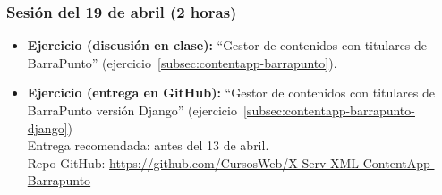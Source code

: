 \documentclass[a4paper,12pt]{article}
\begin{document}
\subsubsection{Sesión del 19 de abril (2 horas)}

\begin{itemize}
\item \textbf{Ejercicio (discusión en clase):} ``Gestor de contenidos con titulares de BarraPunto'' (ejercicio~\ref{subsec:contentapp-barrapunto}). 
\item \textbf{Ejercicio (entrega en GitHub):} ``Gestor de contenidos con titulares de BarraPunto versión Django'' (ejercicio~\ref{subsec:contentapp-barrapunto-django}) \\
  Entrega recomendada: antes del 13 de abril. \\
  Repo GitHub: \url{https://github.com/CursosWeb/X-Serv-XML-ContentApp-Barrapunto}
\end{itemize}


%
%
%
%
\end{document}
